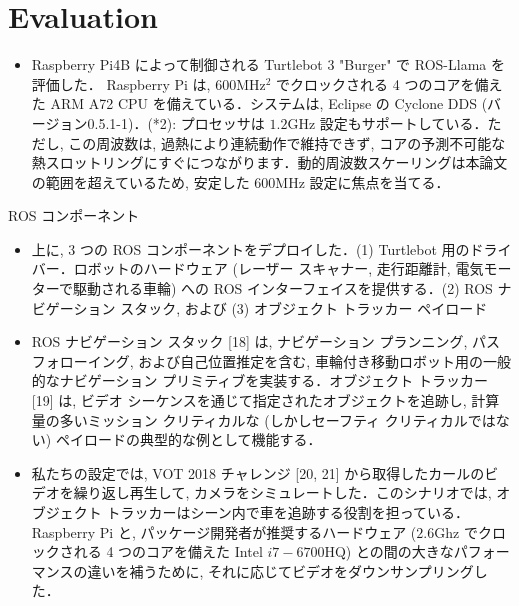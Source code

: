 
\section{Evaluation}
\label{sec: evaluation}

\begin{frame}{}
    \begin{itemize}
        \item Raspberry Pi4B によって制御される Turtlebot 3 "Burger" で ROS-Llama を評価した． Raspberry Pi は, $600 \mathrm{MHz}{ }^{2}$ でクロックされる 4 つのコアを備えた ARM A72 CPU を備えている．システムは, Eclipse の Cyclone DDS (バージョン0.5.1-1)．(*2): プロセッサは $1.2 \mathrm{GHz}$ 設定もサポートしている．ただし, この周波数は, 過熱により連続動作で維持できず, コアの予測不可能な熱スロットリングにすぐにつながります．動的周波数スケーリングは本論文の範囲を超えているため, 安定した $600 \mathrm{MHz}$ 設定に焦点を当てる．
    \end{itemize}
\end{frame}

\begin{frame}{ROS コンポーネント}
    \begin{itemize}
        \item 上に, 3 つの ROS コンポーネントをデプロイした．(1) Turtlebot 用のドライバー．ロボットのハードウェア (レーザー スキャナー, 走行距離計, 電気モーターで駆動される車輪) への ROS インターフェイスを提供する．(2) ROS ナビゲーション スタック, および (3) オブジェクト トラッカー ペイロード
    \end{itemize}
\end{frame}

\begin{frame}{}
    \begin{itemize}
        \item ROS ナビゲーション スタック [18] は, ナビゲーション プランニング, パス フォローイング, および自己位置推定を含む, 車輪付き移動ロボット用の一般的なナビゲーション プリミティブを実装する．オブジェクト トラッカー [19] は, ビデオ シーケンスを通じて指定されたオブジェクトを追跡し, 計算量の多いミッション クリティカルな (しかしセーフティ クリティカルではない) ペイロードの典型的な例として機能する．
    \end{itemize}
\end{frame}

\begin{frame}{}
    \begin{itemize}
        \item 私たちの設定では, VOT 2018 チャレンジ [20, 21] から取得したカールのビデオを繰り返し再生して, カメラをシミュレートした．このシナリオでは, オブジェクト トラッカーはシーン内で車を追跡する役割を担っている． Raspberry Pi と, パッケージ開発者が推奨するハードウェア ($2.6 \mathrm{Ghz}$ でクロックされる 4 つのコアを備えた Intel $i 7-6700 \mathrm{HQ}$) との間の大きなパフォーマンスの違いを補うために, それに応じてビデオをダウンサンプリングした．
    \end{itemize}
\end{frame}

